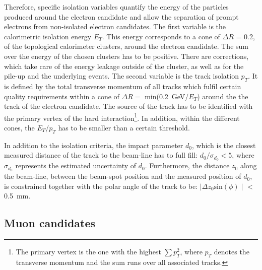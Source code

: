  Therefore, specific isolation variables quantify the energy of the particles produced around the electron candidate and allow the separation of prompt electrons from non-isolated electron candidates.  The first variable is  the calorimetric isolation energy $E_T$.  This energy corresponds to a cone of  $\Delta R$ = 0.2, of the  topological calorimeter clusters, around the electron candidate. The sum over the energy of the chosen clusters has to be positive. There are corrections, which take care of the energy leakage outside of the cluster, as well as for the pile-up and the underlying events. The second variable is the track isolation $p_T$. It is defined by the total transverse momentum of all tracks which fulfil  certain quality requirements within a cone of $\Delta R =$ min(0.2~GeV/$E_T$) around the the track of the electron candidate. The source of the track has to be identified with the primary vertex of the hard interaction\footnote{The primary vertex is the one  with the highest   $\sum p_T^2$, where  $p_T$ denotes the transverse momentum and the sum runs over all associated  tracks.}. In addition, within the different cones, the $E_T$/$p_T$ has to be smaller than a certain threshold.~\cite{ATLAS:2016iqc}

 In addition to the isolation criteria, the impact parameter $d_0$, which is the closest measured distance of the track to the beam-line has to full fill: $d_0/\sigma_{d_0} <5$, where  $\sigma_{d_0}$ represents the estimated uncertainty of $d_0$. Furthermore, the distance $z_0$ along the beam-line, between the beam-spot position and the measured position of $d_0$,  is constrained together with the polar angle of the track to be: $\mid \Delta z_0 \text{sin}(\phi) \mid$ < 0.5~mm. ~\cite{ATLAS:2016iqc}







\subsection{Muon candidates}


